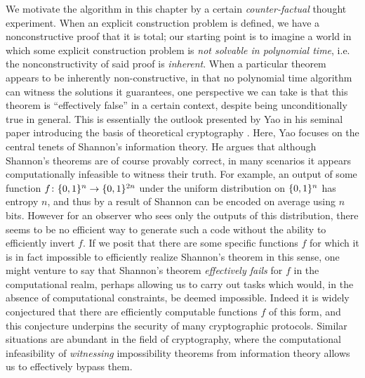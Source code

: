 We motivate the algorithm in this chapter by a certain \emph{counter-factual} thought experiment. When an explicit construction problem is defined, we have a nonconstructive proof that it is total; our starting point is to imagine a world in which some explicit construction problem is \emph{not solvable in polynomial time}, i.e. the nonconstructivity of said proof is \emph{inherent}.
When a particular theorem appears to be inherently non-constructive, in that no polynomial time algorithm can witness the solutions it guarantees, one perspective we can take is that this theorem is ``effectively false'' in a certain context, despite being unconditionally true in general. This is essentially the outlook presented by Yao in his seminal paper introducing the basis of theoretical cryptography \cite{Yao}. Here, Yao focuses on the central tenets of Shannon's information theory.
He argues that although Shannon's theorems are of course provably correct, in many scenarios it appears computationally infeasible to witness their truth. For example, an output of some function $f \colon\{0,1\}^n \rightarrow \{0,1\}^{2n}$ under the uniform distribution on $\{0,1\}^n$ has entropy $n$, and thus by a result of Shannon can be encoded on average using $n$ bits. However for an observer who sees only the outputs of this distribution, there seems to be no efficient way to generate such a code without the ability to efficiently invert $f$. If we posit that there are some specific functions $f$ for which it is in fact impossible to efficiently realize Shannon's theorem in this sense, one might venture to say that Shannon's theorem \emph{effectively fails} for $f$ in the computational realm, perhaps allowing us to carry out tasks which would, in the absence of computational constraints, be deemed impossible. Indeed it is widely conjectured that there are efficiently computable functions $f$ of this form, and this conjecture underpins the security of many cryptographic protocols. Similar situations are abundant in the field of cryptography, where the computational infeasibility of \emph{witnessing} impossibility theorems from information theory allows us to effectively bypass them.

